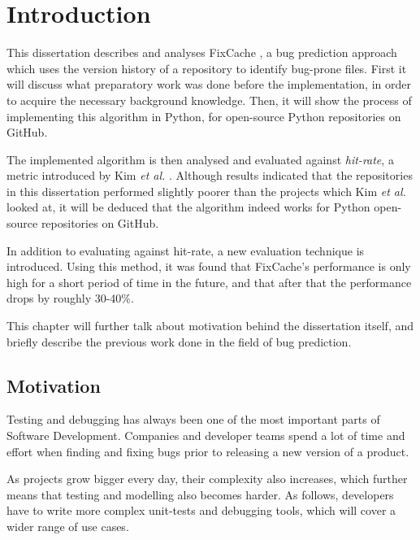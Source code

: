 \documentclass[12pt,twoside,notitlepage]{report}
\newcommand{\fxch}{FixCache}
\newcommand{\etal}{\textit{et al.}}
\begin{document}

\cleardoublepage        %
\setcounter{page}{1}
\pagestyle{headings}
\chapter{Introduction}
This dissertation describes and analyses \fxch{} \cite{FixCache}, a bug prediction approach which uses  the version history of a repository to identify bug-prone files. First it will discuss what preparatory work was done before the implementation, in order to acquire the necessary background knowledge. Then, it will show the process of implementing this algorithm in Python, for open-source Python repositories on GitHub.

The implemented algorithm is then analysed and evaluated against \textit{hit-rate}, a metric introduced by Kim \etal{} \cite{FixCache}. Although results indicated that the repositories in this dissertation performed slightly poorer than the projects which Kim \etal{} looked at, it will be deduced that the algorithm indeed works for Python open-source repositories on GitHub.

In addition to evaluating against hit-rate, a new evaluation technique is introduced. Using this method, it was found that \fxch{}'s performance is only high for a short period of time in the future, and that after that the performance drops by roughly 30-40\%.

This chapter will further talk about motivation behind the dissertation itself, and briefly describe the previous work done in the field of bug prediction.
\clearpage
\section{Motivation}
Testing and debugging has always been one of the most important parts of Software Development. Companies and developer teams spend a lot of time and effort when finding and fixing bugs prior to releasing a new version of a product.

As projects grow bigger every day, their complexity also increases, which further means that testing and modelling also becomes harder. As follows, developers have to write more complex unit-tests and debugging tools, which will cover a wider range of use cases.
\end{document}
